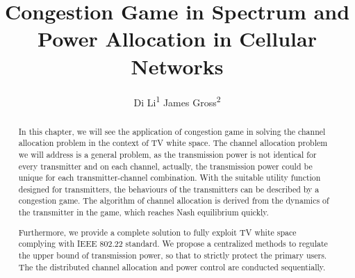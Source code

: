 \documentclass[times]{ettauth}
\theoremstyle{mytheoremstyle}
\theoremstyle{mytheoremstyle}
\theoremstyle{mytheoremstyle}
\begin{document}


\title{Congestion Game in Spectrum and Power Allocation in Cellular Networks}
\author{Di Li\textsuperscript{1} James Gross\textsuperscript{2}}
\address{RWTH Aachen University\textsuperscript{1}, KTH Royal Institute of Technology\textsuperscript{2} }




\begin{abstract}
\small In this chapter, we will see the application of congestion game in solving the channel allocation problem in the context of TV white space.
The channel allocation problem we will address is a general problem, as the transmission power is not identical for every transmitter and on each channel, actually, the transmission power could be unique for each transmitter-channel combination.
With the suitable utility function designed for transmitters, the behaviours of the transmitters can be described by a congestion game.
The algorithm of channel allocation is derived from the dynamics of the transmitter in the game, which reaches Nash equilibrium quickly.

Furthermore, we provide a complete solution to fully exploit TV white space complying with IEEE 802.22 standard.
We propose a centralized methods to regulate the upper bound of transmission power, so that to strictly protect the primary users.
The the distributed channel allocation and power control are conducted sequentially.
\end{abstract}
\end{document}
